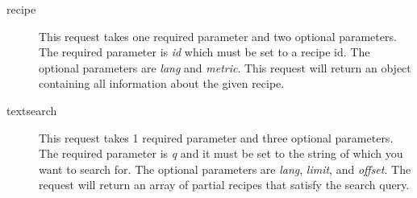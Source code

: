 \begin{description}
\item[recipe] This request takes one required parameter and two optional parameters. The required parameter is \textit{id} which must be set to a recipe id. The optional parameters are \textit{lang} and \textit{metric}. This request will return an object containing all information about the given recipe.
\item[textsearch] This request takes 1 required parameter and three optional parameters. The required parameter is \textit{q} and it must be set to the string of which you want to search for. The optional parameters are \textit{lang}, \textit{limit}, and \textit{offset}. The request will return an array of partial recipes that satisfy the search query.
\end{description}



